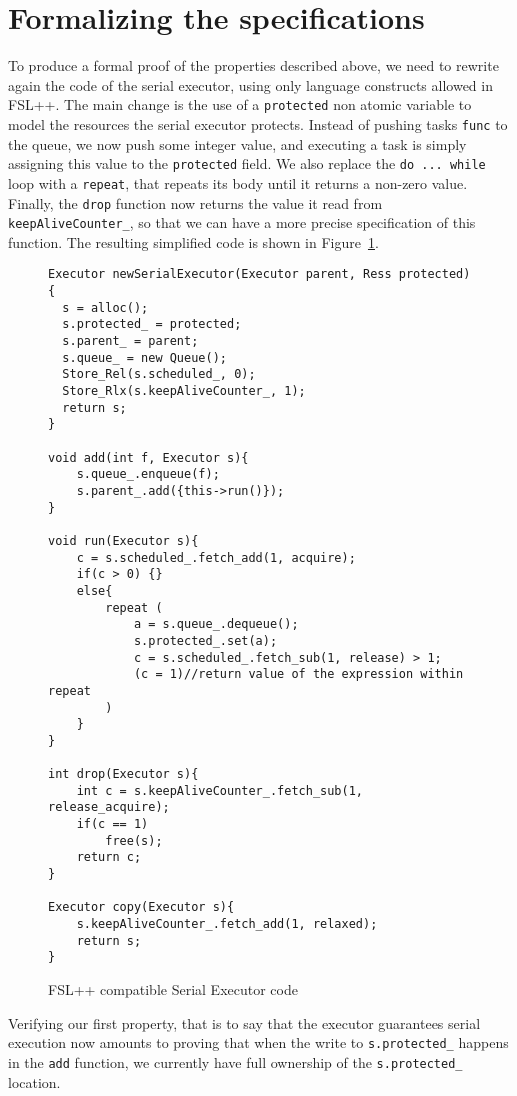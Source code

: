 \section{Formalizing the specifications}

To produce a formal proof of the properties described above, we need to rewrite again the code of the serial executor, using only language constructs allowed in FSL++. The main change is the use of a \texttt{protected} non atomic variable to model the resources the serial executor protects. Instead of pushing tasks \texttt{func} to the queue, we now push some integer value, and executing a task is simply assigning this value to the \texttt{protected} field. We also replace the \texttt{do ... while} loop with a \texttt{repeat}, that repeats its body until it returns a non-zero value. Finally, the \texttt{drop} function now returns the value it read from \texttt{keepAliveCounter\_}, so that we can have a more precise specification of this function. The resulting simplified code is shown in Figure~\ref{fig:serialExecCP}.

\begin{figure}
	\begin{lstlisting}
Executor newSerialExecutor(Executor parent, Ress protected){
  s = alloc();
  s.protected_ = protected;
  s.parent_ = parent;
  s.queue_ = new Queue();
  Store_Rel(s.scheduled_, 0);
  Store_Rlx(s.keepAliveCounter_, 1);
  return s;
}

void add(int f, Executor s){
	s.queue_.enqueue(f);
	s.parent_.add({this->run()});
}

void run(Executor s){
	c = s.scheduled_.fetch_add(1, acquire);
	if(c > 0) {}
	else{
		repeat (
			a = s.queue_.dequeue();
			s.protected_.set(a);
			c = s.scheduled_.fetch_sub(1, release) > 1;
			(c = 1)//return value of the expression within repeat
		)
	}
}

int drop(Executor s){
	int c = s.keepAliveCounter_.fetch_sub(1, release_acquire);
	if(c == 1)
		free(s);
	return c;
}

Executor copy(Executor s){
	s.keepAliveCounter_.fetch_add(1, relaxed);
	return s;
}
	\end{lstlisting}


	\caption{FSL++ compatible Serial Executor code}
	\label{fig:serialExecCP}
\end{figure}

Verifying our first property, that is to say that the executor guarantees serial execution now amounts to proving that when the write to \texttt{s.protected\_} happens in the \texttt{add} function, we currently have full ownership of the \texttt{s.protected\_} location.

